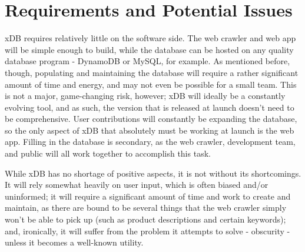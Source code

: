 \documentclass[letterpaper,12pt,titlepage]{article}
\begin{document}
\section{Requirements and Potential Issues}
xDB requires relatively little on the software side. The web crawler and web app will be simple enough to build, while the database can be hosted on any quality database program - DynamoDB or MySQL, for example. As mentioned before, though, populating and maintaining the database will require a rather significant amount of time and energy, and may not even be possible for a small team. This is not a major, game-changing risk, however; xDB will ideally be a constantly evolving tool, and as such, the version that is released at launch doesn't need to be comprehensive. User contributions will constantly be expanding the database, so the only aspect of xDB that absolutely must be working at launch is the web app. Filling in the database is secondary, as the web crawler, development team, and public will all work together to accomplish this task.

While xDB has no shortage of positive aspects, it is not without its shortcomings. It will rely somewhat heavily on user input, which is often biased and/or uninformed; it will require a significant amount of time and work to create and maintain, as there are bound to be several things that the web crawler simply won't be able to pick up (such as product descriptions and certain keywords); and, ironically, it will suffer from the problem it attempts to solve - obscurity - unless it becomes a well-known utility. 
\end{document}
